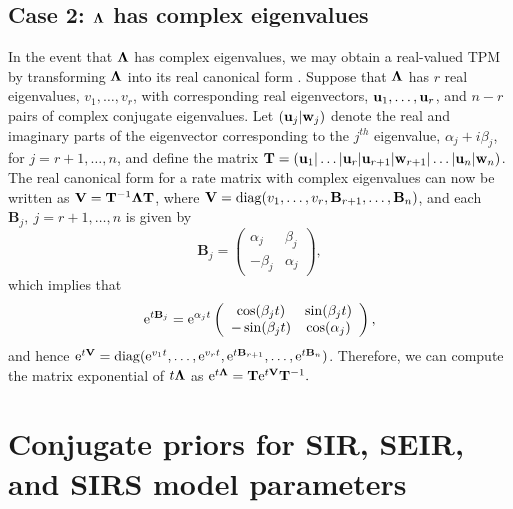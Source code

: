 \subsection{Case 2: $ \boldsymbol{\Lambda} $ has complex eigenvalues}
In the event that $ \boldsymbol{\Lambda} $ has complex eigenvalues, we may obtain a real-valued TPM by transforming $ \boldsymbol{\Lambda} $ into its real canonical form \citep{hirsch2013differential}. Suppose that $ \boldsymbol{\Lambda} $ has $ r $ real eigenvalues, $ v_1,\dots,v_r $, with corresponding real eigenvectors, $ \mathbf{u}_1,\dots,\mathbf{u}_r $, and $ n-r $ pairs of complex conjugate eigenvalues. Let $ (\mathbf{u}_j|\mathbf{w}_j) $ denote the real and imaginary parts of the eigenvector corresponding to the $ j^{th} $ eigenvalue, $ \alpha_j + i\beta_j $, for $ j = r+1,\dots,n $, and define the matrix $ \mathbf{T} = \left (\mathbf{u}_1|\dots|\mathbf{u}_r|\mathbf{u}_{r+1}|\mathbf{w}_{r+1}|\dots|\mathbf{u}_n|\mathbf{w}_n\right ) $. 
The real canonical form for a rate matrix with complex eigenvalues can now be written as $ \mathbf{V} = \mathbf{T}^{-1}\boldsymbol{\Lambda} \mathbf{T} $, where $ \mathbf{V} = \mathrm{diag}(v_1,\dots,v_r,\mathbf{B}_{r+1},\dots, \mathbf{B}_n) $, and each $ \mathbf{B}_j,\ j=r+1,\dots,n $ is given by 
\[ \mathbf{B}_j = \left (\begin{array}{cc}
\alpha_j & \beta_j \\
-\beta_j & \alpha_j
\end{array}\right ), \]
which implies that 
\[ \mathrm{e}^{t\mathbf{B}_j} = \mathrm{e}^{\alpha_jt}\left (\begin{array}{cc}
\cos(\beta_jt) & \sin(\beta_jt) \\
-\sin(\beta_jt) & \cos(\alpha_j)
\end{array}\right ), \]
and hence $ \mathrm{e}^{t\mathbf{V}} = \mathrm{diag}(\mathrm{e}^{v_1t},\dots,\mathrm{e}^{v_rt},\mathrm{e}^{t\mathbf{B}_{r+1}},\dots, \mathrm{e}^{t\mathbf{B}_n}) $. Therefore, we can compute the matrix exponential of $ t\boldsymbol{\Lambda} $ as $ \mathrm{e}^{t\boldsymbol{\Lambda}} = \mathbf{T}\mathrm{e}^{t\mathbf{V}}\mathbf{T}^{-1}. $

\newpage
\section{Conjugate priors for SIR, SEIR, and SIRS model parameters}
\label{sec:bda_priors}

